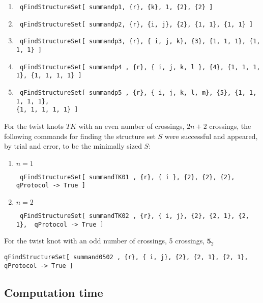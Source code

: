 \documentclass[a4paper,titlepage,twoside]{book}
\begin{document}
\begin{appendix}
\begin{enumerate}
\item \begin{verbatim} qFindStructureSet[ summandp1, {r}, {k}, 1, {2}, {2} ] \end{verbatim}
\item \begin{verbatim} qFindStructureSet[ summandp2, {r}, {i, j}, {2}, {1, 1}, {1, 1} ] \end{verbatim}
\item \begin{verbatim} qFindStructureSet[ summandp3, {r}, { i, j, k}, {3}, {1, 1, 1}, {1, 1, 1} ] \end{verbatim}
\item \begin{verbatim} qFindStructureSet[ summandp4 , {r}, { i, j, k, l }, {4}, {1, 1, 1, 1}, {1, 1, 1, 1} ] \end{verbatim}
\item \begin{verbatim} qFindStructureSet[ summandp5 , {r}, { i, j, k, l, m}, {5}, {1, 1, 1, 1, 1}, 
{1, 1, 1, 1, 1} ] \end{verbatim}
\end{enumerate} 

For the twist knots $TK$ with an even number of crossings, $2n+2$ crossings, the following commands for finding the structure set $S$ were successful and appeared, by trial and error, to be the minimally sized $S$:

\begin{enumerate}
  \item $n=1$ \begin{verbatim} qFindStructureSet[ summandTK01 , {r}, { i }, {2}, {2}, {2},  qProtocol -> True ] \end{verbatim}
\item $n=2$ \begin{verbatim} qFindStructureSet[ summandTK02 , {r}, { i, j}, {2}, {2, 1}, {2, 1},  qProtocol -> True ] \end{verbatim}
\end{enumerate}

For the twist knot with an odd number of crossings, 5 crossings, $\mathbf{5}_2$

\begin{verbatim}
qFindStructureSet[ summand0502 , {r}, { i, j}, {2}, {2, 1}, {2, 1},  qProtocol -> True ]
\end{verbatim}

\subsection{Computation time}


\end{appendix}
\end{document}
